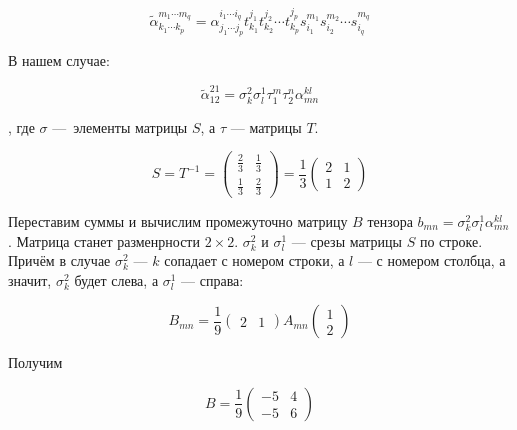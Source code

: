\documentclass[12pt, a4paper]{article}
\begin{document}
    \begin{equation}
        {\tilde{\alpha}}^{m_1\cdots m_q}_{k_1\cdots k_p}=\alpha^{i_1\cdots i_q}_{j_1\cdots j_p}t_{k_1}^{j_1}t_{k_2}^{j_2}\cdots t_{k_p}^{j_p}s_{i_1}^{m_1}s_{i_2}^{m_2}\cdots s_{i_q}^{m_q}
    \end{equation}

    В нашем случае:

    \begin{equation}
        \tilde{\alpha}_{12}^{21}=\sigma_{k}^{2} \sigma_{l}^{1} \tau_{1}^{m} \tau_{2}^{n} \alpha_{m n}^{k l}
    \end{equation}

    , где $\sigma$ — элементы матрицы $S$, а $\tau$ — матрицы $T$.

    \begin{equation}
        S = T^{-1} = \left(\begin{matrix}
            \frac{2}{3} & \frac{1}{3} \\
            \frac{1}{3} & \frac{2}{3}
        \end{matrix}\right) = \frac{1}{3} \left(\begin{matrix}
            2 & 1 \\
            1 & 2
        \end{matrix}\right)
    \end{equation}

    Переставим суммы и вычислим промежуточно матрицу $B$ тензора $b_{mn} = \sigma_{k}^{2} \sigma_{l}^{1} \alpha_{m n}^{k l}$.
    Матрица станет разменрности $2 \times 2$. 
    $\sigma_{k}^{2}$ и $\sigma_{l}^{1}$ — срезы матрицы $S$ по строке.
    Причём в случае $\sigma_{k}^{2}$ — $k$ сопадает с номером строки, а $l$ — с номером столбца,
    а значит, $\sigma_{k}^{2}$ будет слева, а $\sigma_{l}^{1}$ — справа:
    
    \begin{equation}
        B_{mn} = 
        \frac{1}{9} \begin{pmatrix} 2 & 1 \end{pmatrix} A_{mn} \begin{pmatrix} 1 \\ 2 \end{pmatrix}
    \end{equation}

    Получим
    
    \begin{equation}
        B = \frac{1}{9} \begin{pmatrix}
            -5 & 4 \\
            -5 & 6
        \end{pmatrix}
    \end{equation}
\end{document}
